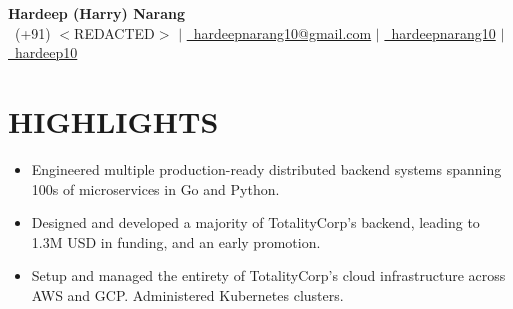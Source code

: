 \documentclass[a4paper,20pt]{article}
\renewcommand{\labelitemi}{$\vcenter{\hbox{\boldmath$\cdot$}}$}
\begin{document}
\begin{center}
    \textbf{{\LARGE Hardeep (Harry) Narang}}\\[0.08in]
    {{\faPhone~\small(+91) $<$REDACTED$>$}} $|$
    \href{mailto:hardeepnarang10@gmail.com}
    {{\faEnvelope~hardeepnarang10@gmail.com}} $|$
    \href{https://github.com/hardeepnarang10}{{\faGithub~hardeepnarang10}} $|$
    \href{https://linkedin.com/in/hardeep10}{{\faLinkedinSquare~hardeep10}}
    \\
\end{center}

\vspace{-3pt}
\section{\textbf{HIGHLIGHTS}}
\begin{itemize}[leftmargin=8pt]
\justifying
\small
\vspace{3pt}
\renewcommand{\labelitemi}{$\vcenter{\hbox{\boldmath$\cdot$}}$}
\item Engineered multiple production-ready distributed backend systems spanning 100s of microservices in Go and Python.
\vspace{-6pt}
\item Designed and developed a majority of TotalityCorp’s backend, leading to 1.3M USD in funding, and an early promotion.
\vspace{-6pt}
\item Setup and managed the entirety of TotalityCorp's cloud infrastructure across AWS and GCP. Administered Kubernetes clusters.
\vspace{-11pt}
\end{itemize}
\vspace{-6pt}
\end{document}
